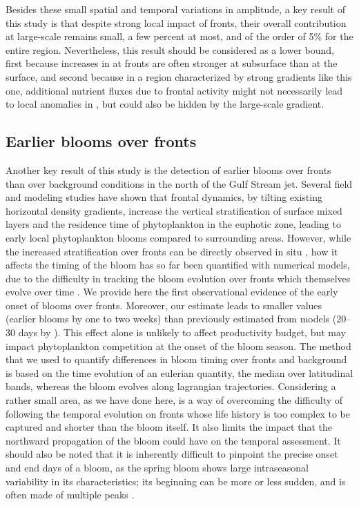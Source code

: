 Besides these small spatial and temporal variations in amplitude, a key result of this study is that despite strong local impact of fronts, their overall contribution at large-scale remains small, a few percent at most, and of the order of 5\% for the entire region.
Nevertheless, this result should be considered as a lower bound, first because increases in  at fronts are often stronger at subsurface than at the surface, and second because in a region characterized by strong gradients like this one, additional nutrient fluxes due to frontal activity might not necessarily lead to local anomalies in , but could also be hidden by the large-scale gradient.


\subsection{Earlier blooms over fronts}

Another key result of this study is the detection of earlier blooms over fronts than over background conditions in the north of the Gulf Stream jet.
Several field and modeling studies have shown that frontal dynamics, by tilting existing horizontal density gradients, increase the vertical stratification of surface mixed layers \citep{taylor_2011} and the residence time of phytoplankton in the euphotic zone, leading to early local phytoplankton blooms compared to surrounding areas.
However, while the increased stratification over fronts can be directly observed in situ \citep{karleskind_2011, mahadevan_2012}, how it affects the timing of the bloom has so far been quantified with numerical models, due to the difficulty in tracking the bloom evolution over fronts which themselves evolve over time \citep{levy_2000, karleskind_2011, mahadevan_2012}.
We provide here the first observational evidence of the early onset of blooms over fronts.
Moreover, our estimate leads to smaller values (earlier blooms by one to two weeks) than previously estimated from models (20--30 days by \citet{mahadevan_2012}).
This effect alone is unlikely to affect productivity budget, but may impact phytoplankton competition at the onset of the bloom season.
The method that we used to quantify differences in bloom timing over fronts and background is based on the time evolution of an eulerian quantity, the  median over latitudinal bands, whereas the bloom evolves along lagrangian trajectories.
Considering a rather small area, as we have done here, is a way of overcoming the difficulty of following the temporal evolution on fronts whose life history is too complex to be captured and shorter than the bloom itself.
It also limits the impact that the northward propagation of the bloom could have on the temporal assessment.
It should also be noted that it is inherently difficult to pinpoint the precise onset and end days of a bloom, as the spring bloom shows large intraseasonal variability in its characteristics; its beginning can be more or less sudden, and is often made of multiple peaks \citep{keerthi_2020}.


